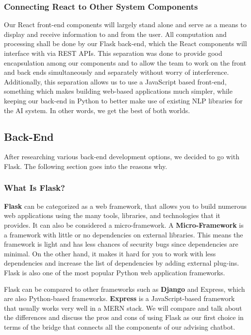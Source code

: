 \documentclass[titlepage, 12pt]{article}
\begin{document}
\subsubsection{Connecting React to Other System Components}

Our React front-end components will largely stand alone and serve as a means to display and receive information to and from the user. All computation and processing shall be done by our Flask back-end, which the React components will interface with via REST APIs. This separation was done to provide good encapsulation among our components and to allow the team to work on the front and back ends simultaneously and separately without worry of interference. Additionally, this separation allows us to use a JavaScript based front-end, something which makes building web-based applications much simpler, while keeping our back-end in Python to better make use of existing NLP libraries for the AI system. In other words, we get the best of both worlds.


\subsection{Back-End}

After researching various back-end development options, we decided to go with Flask. The following section goes into the reasons why.

\subsubsection{What Is Flask?}

\textbf{Flask} can be categorized as a web framework, that allows you to build numerous web applications using the many tools, libraries, and technologies that it provides. It can also be considered a micro-framework. A \textbf{Micro-Framework} is a framework with little or no dependencies on external libraries. This means the framework is light and has less chances of security bugs since dependencies are minimal. On the other hand, it makes it hard for you to work with less dependencies and increase the list of dependencies by adding external plug-ins. Flask is also one of the most popular Python web application frameworks.

Flask can be compared to other frameworks such as \textbf{Django} and Express, which are also Python-based frameworks. \textbf{Express} is a JavaScript-based framework that usually works very well in a MERN stack. We will compare and talk about the differences and discuss the pros and cons of using Flask as our first choice in terms of the bridge that connects all the components of our advising chatbot.
\end{document}
